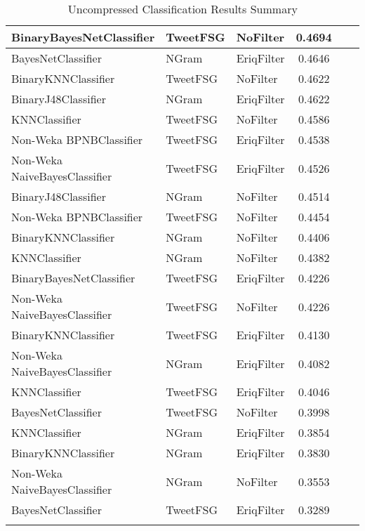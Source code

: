 \begin{center}
\begin{longtable}{|l|l|l|c|c|c|}
      \tabularnewline\hline
         BinaryBayesNetClassifier & TweetFSG & NoFilter & 0.4694
      \tabularnewline\hline
         BayesNetClassifier & NGram & EriqFilter & 0.4646
      \tabularnewline\hline
         BinaryKNNClassifier & TweetFSG & NoFilter & 0.4622
      \tabularnewline\hline
         BinaryJ48Classifier & NGram & EriqFilter & 0.4622
      \tabularnewline\hline
         KNNClassifier & TweetFSG & NoFilter & 0.4586
      \tabularnewline\hline
         Non-Weka BPNBClassifier & TweetFSG & EriqFilter & 0.4538
      \tabularnewline\hline
         Non-Weka NaiveBayesClassifier & TweetFSG & EriqFilter & 0.4526
      \tabularnewline\hline
         BinaryJ48Classifier & NGram & NoFilter & 0.4514
      \tabularnewline\hline
         Non-Weka BPNBClassifier & TweetFSG & NoFilter & 0.4454
      \tabularnewline\hline
         BinaryKNNClassifier & NGram & NoFilter & 0.4406
      \tabularnewline\hline
         KNNClassifier & NGram & NoFilter & 0.4382
      \tabularnewline\hline
         BinaryBayesNetClassifier & TweetFSG & EriqFilter & 0.4226
      \tabularnewline\hline
         Non-Weka NaiveBayesClassifier & TweetFSG & NoFilter & 0.4226
      \tabularnewline\hline
         BinaryKNNClassifier & TweetFSG & EriqFilter & 0.4130
      \tabularnewline\hline
         Non-Weka NaiveBayesClassifier & NGram & EriqFilter & 0.4082
      \tabularnewline\hline
         KNNClassifier & TweetFSG & EriqFilter & 0.4046
      \tabularnewline\hline
         BayesNetClassifier & TweetFSG & NoFilter & 0.3998
      \tabularnewline\hline
         KNNClassifier & NGram & EriqFilter & 0.3854
      \tabularnewline\hline
         BinaryKNNClassifier & NGram & EriqFilter & 0.3830
      \tabularnewline\hline
         Non-Weka NaiveBayesClassifier & NGram & NoFilter & 0.3553
      \tabularnewline\hline
         BayesNetClassifier & TweetFSG & EriqFilter & 0.3289
      \tabularnewline\hline
      \caption[Uncompressed Classification Results Summary]{Uncompressed Classification Results Summary}
      \label{table:classification-summary-uncompressed}
   \end{longtable}
\end{center}

